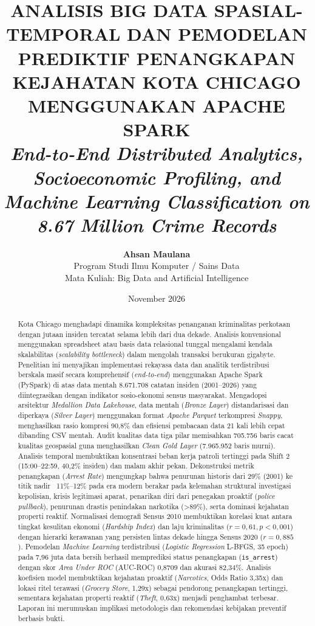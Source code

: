 \documentclass[11pt,a4paper]{article}
\title{
    \vspace{-1.5cm}
    \textbf{\Large ANALISIS BIG DATA SPASIAL-TEMPORAL DAN PEMODELAN PREDIKTIF PENANGKAPAN KEJAHATAN KOTA CHICAGO MENGGUNAKAN APACHE SPARK}\\
    \vspace{0.3cm}
    \large\textit{End-to-End Distributed Analytics, Socioeconomic Profiling, and Machine Learning Classification on 8.67 Million Crime Records}
}
\author{
    \textbf{Ahsan Maulana}\\[0.15cm]
    \normalsize Program Studi Ilmu Komputer / Sains Data\\
    \normalsize Mata Kuliah: Big Data and Artificial Intelligence
}
\date{November 2026}
\begin{document}
\maketitle
\thispagestyle{fancy}

\begin{abstract}
\noindent
Kota Chicago menghadapi dinamika kompleksitas penanganan kriminalitas perkotaan dengan jutaan insiden tercatat selama lebih dari dua dekade. Analisis konvensional menggunakan spreadsheet atau basis data relasional tunggal mengalami kendala skalabilitas (\textit{scalability bottleneck}) dalam mengolah transaksi berukuran gigabyte. Penelitian ini menyajikan implementasi rekayasa data dan analitik terdistribusi berskala masif secara komprehensif (\textit{end-to-end}) menggunakan Apache Spark (PySpark) di atas data mentah 8.671.708 catatan insiden (2001--2026) yang diintegrasikan dengan indikator sosio-ekonomi sensus masyarakat. Mengadopsi arsitektur \textit{Medallion Data Lakehouse}, data mentah (\textit{Bronze Layer}) distandarisasi dan diperkaya (\textit{Silver Layer}) menggunakan format \textit{Apache Parquet} terkompresi \textit{Snappy}, menghasilkan rasio kompresi 90,8\% dan efisiensi pembacaan data 21 kali lebih cepat dibanding CSV mentah. Audit kualitas data tiga pilar memisahkan 705.756 baris cacat kualitas geospasial guna menghasilkan \textit{Clean Gold Layer} (7.965.952 baris murni). Analisis temporal membuktikan konsentrasi beban kerja patroli tertinggi pada Shift 2 (15:00--22:59, 40,2\% insiden) dan malam akhir pekan. Dekonstruksi metrik penangkapan (\textit{Arrest Rate}) mengungkap bahwa penurunan historis dari 29\% (2001) ke titik nadir ~11\%--12\% pada era modern berakar pada kelemahan struktural investigasi kepolisian, krisis legitimasi aparat, penarikan diri dari penegakan proaktif (\textit{police pullback}), penurunan drastis penindakan narkotika (>89\%), serta dominasi kejahatan properti reaktif. Normalisasi demografi Sensus 2010 membuktikan korelasi kuat antara tingkat kesulitan ekonomi (\textit{Hardship Index}) dan laju kriminalitas ($r = 0,61, p < 0,001$) dengan hierarki kerawanan yang persisten lintas dekade hingga Sensus 2020 ($r = 0,885$). Pemodelan \textit{Machine Learning} terdistribusi (\textit{Logistic Regression} L-BFGS, 35 epoch) pada 7,96 juta data bersih berhasil memprediksi status penangkapan (\texttt{is\_arrest}) dengan skor \textit{Area Under ROC} (AUC-ROC) 0,8709 dan akurasi 82,34\%. Analisis koefisien model membuktikan kejahatan proaktif (\textit{Narcotics}, Odds Ratio 3,35x) dan lokasi ritel terawasi (\textit{Grocery Store}, 1,29x) sebagai pendorong penangkapan tertinggi, sementara kejahatan properti reaktif (\textit{Theft}, 0,63x) menjadi penghambat terbesar. Laporan ini merumuskan implikasi metodologis dan rekomendasi kebijakan preventif berbasis bukti.
\end{abstract}
\end{document}

